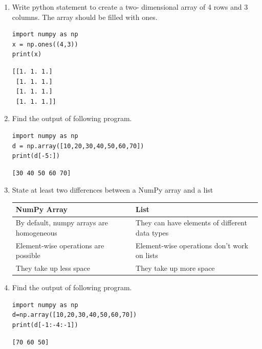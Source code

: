 \documentclass[11pt]{article}
\begin{document}
\begin{enumerate}
\begin{verbatim}
[2 4 6]
[4 8 2]
\end{verbatim}

\item Write python statement to create a two- dimensional array of 4 rows and 3 columns. The array should be filled with ones.
\begin{verbatim}
import numpy as np
x = np.ones((4,3))
print(x)
\end{verbatim}

\begin{verbatim}
[[1. 1. 1.]
 [1. 1. 1.]
 [1. 1. 1.]
 [1. 1. 1.]]
\end{verbatim}

\item Find the output of following program.
\begin{verbatim}
import numpy as np
d = np.array([10,20,30,40,50,60,70])
print(d[-5:])
\end{verbatim}

\begin{verbatim}
[30 40 50 60 70]
\end{verbatim}

\item State at least two differences between a NumPy array and a list
\begin{center}
\begin{tabular}{|l|l|}
\hline
NumPy Array & List\\
\hline
By default, numpy arrays are homogeneous & They can have elements of different data types\\
Element-wise operations are possible & Element-wise operations don’t work on lists\\
They take up less space & They take up more space\\
\hline
\end{tabular}
\end{center}

\item Find the output of following program.
\begin{verbatim}
import numpy as np
d=np.array([10,20,30,40,50,60,70])
print(d[-1:-4:-1])
\end{verbatim}

\begin{verbatim}
[70 60 50]
\end{verbatim}


\end{enumerate}
\end{document}

